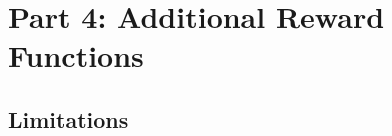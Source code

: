 

\section{Part 4: Additional Reward Functions}
\nestindent

    

    

    

    

    

    

    

    \subsection{Limitations}
    \nestindent
        
    \nestunindent

    \newpage
